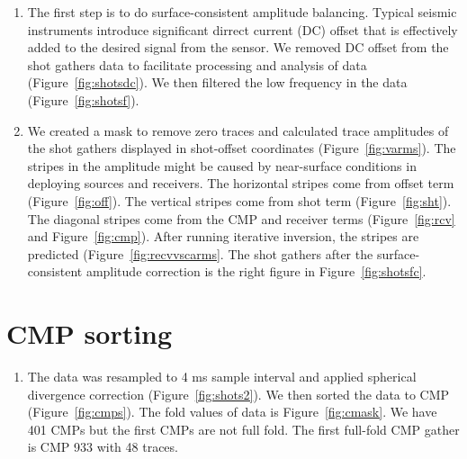 \begin{enumerate}

\item The first step is to do surface-consistent amplitude balancing. Typical seismic instruments introduce significant dirrect current (DC) offset that is effectively added to the desired signal from the sensor. We removed DC offset from the shot gathers data to facilitate processing and analysis of data (Figure~\ref{fig:shotsdc}). We then filtered the low frequency in the data (Figure~\ref{fig:shotsf}).

\item We created a mask to remove zero traces and calculated trace amplitudes of the shot gathers displayed in shot-offset coordinates (Figure~\ref{fig:varms}). The stripes in the amplitude might be caused by near-surface conditions in deploying sources and receivers. The horizontal stripes come from offset term (Figure~\ref{fig:off}). The vertical stripes come from shot term (Figure~\ref{fig:sht}). The diagonal stripes come from the CMP and receiver terms (Figure~\ref{fig:rcv} and Figure~\ref{fig:cmp}). After running iterative inversion, the stripes are predicted (Figure~\ref{fig:recvvscarms}. The shot gathers after the surface-consistent amplitude correction is the right figure in Figure~\ref{fig:shotsfc}.          


\end{enumerate}

\section{CMP sorting}

\begin{enumerate}

\item The data was resampled to 4 ms sample interval and applied spherical divergence correction (Figure~\ref{fig:shots2}). We then sorted the data to CMP (Figure~\ref{fig:cmps}). The fold values of data is Figure~\ref{fig:cmask}. We have 401 CMPs but the first CMPs are not full fold. The first full-fold CMP gather is CMP 933 with 48 traces.

 
\end{enumerate}

